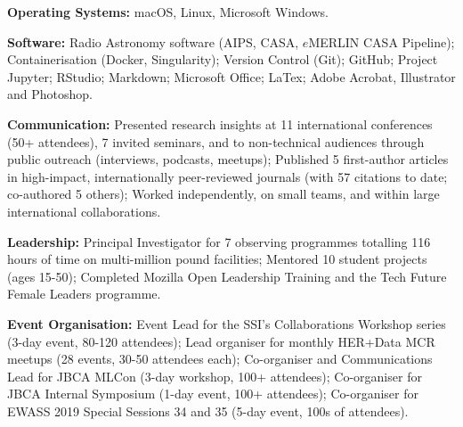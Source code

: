 \begin{cvpubs}
  \cvpub
    {
      \begin{cvlist}
        \item{\textbf{Operating Systems:} macOS, Linux, Microsoft Windows.}
        \item {\textbf{Software:} Radio Astronomy software (AIPS, CASA, $e$MERLIN CASA Pipeline); Containerisation (Docker, Singularity); Version Control (Git); GitHub; Project Jupyter; RStudio; Markdown; Microsoft Office; LaTex; Adobe Acrobat, Illustrator and Photoshop.}
        \item {\textbf{Communication:} Presented research insights at 11 international conferences (50+ attendees), 7 invited seminars, and to non-technical audiences through public outreach (interviews, podcasts, meetups); Published 5 first-author articles in high-impact, internationally peer-reviewed journals (with 57 citations to date; co-authored 5 others); Worked independently, on small teams, and within large international collaborations.}
        \item {\textbf{Leadership:} Principal Investigator for 7 observing programmes totalling 116 hours of time on multi-million pound facilities; Mentored 10 student projects (ages 15-50); Completed Mozilla Open Leadership Training and the Tech Future Female Leaders programme.}
        \item {\textbf{Event Organisation:} Event Lead for the SSI's Collaborations Workshop series (3-day event, 80-120 attendees); Lead organiser for monthly HER+Data MCR meetups (28 events, 30-50 attendees each); Co-organiser and Communications Lead for JBCA MLCon (3-day workshop, 100+ attendees); Co-organiser for JBCA Internal Symposium (1-day event, 100+ attendees); Co-organiser for EWASS 2019 Special Sessions 34 and 35 (5-day event, 100s of attendees).}
      \end{cvlist}
    }
\end{cvpubs}